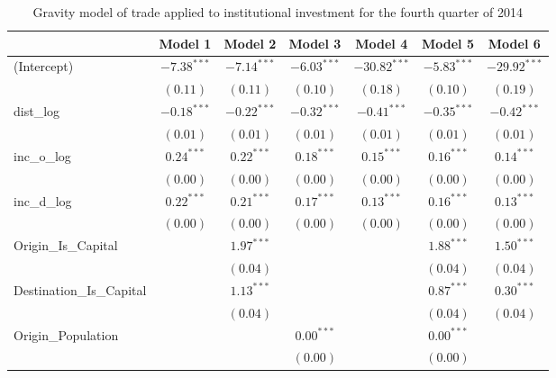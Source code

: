 \begin{table}
	\small
	\begin{center}
		\caption[Gravity Model of Trade for Q4 2014]{Gravity model of trade applied to institutional investment for the fourth quarter of 2014}
		\begin{tabular}{l c c c c c c }
			\hline
			& Model 1 & Model 2 & Model 3 & Model 4 & Model 5 & Model 6 \\
			\hline
			(Intercept)                  & $-7.38^{***}$ & $-7.14^{***}$ & $-6.03^{***}$ & $-30.82^{***}$ & $-5.83^{***}$ & $-29.92^{***}$ \\
			& $(0.11)$      & $(0.11)$      & $(0.10)$      & $(0.18)$       & $(0.10)$      & $(0.19)$       \\
			dist\_log                    & $-0.18^{***}$ & $-0.22^{***}$ & $-0.32^{***}$ & $-0.41^{***}$  & $-0.35^{***}$ & $-0.42^{***}$  \\
			& $(0.01)$      & $(0.01)$      & $(0.01)$      & $(0.01)$       & $(0.01)$      & $(0.01)$       \\
			inc\_o\_log                  & $0.24^{***}$  & $0.22^{***}$  & $0.18^{***}$  & $0.15^{***}$   & $0.16^{***}$  & $0.14^{***}$   \\
			& $(0.00)$      & $(0.00)$      & $(0.00)$      & $(0.00)$       & $(0.00)$      & $(0.00)$       \\
			inc\_d\_log                  & $0.22^{***}$  & $0.21^{***}$  & $0.17^{***}$  & $0.13^{***}$   & $0.16^{***}$  & $0.13^{***}$   \\
			& $(0.00)$      & $(0.00)$      & $(0.00)$      & $(0.00)$       & $(0.00)$      & $(0.00)$       \\
			Origin\_Is\_Capital          &               & $1.97^{***}$  &               &                & $1.88^{***}$  & $1.50^{***}$   \\
			&               & $(0.04)$      &               &                & $(0.04)$      & $(0.04)$       \\
			Destination\_Is\_Capital     &               & $1.13^{***}$  &               &                & $0.87^{***}$  & $0.30^{***}$   \\
			&               & $(0.04)$      &               &                & $(0.04)$      & $(0.04)$       \\
			Origin\_Population           &               &               & $0.00^{***}$  &                & $0.00^{***}$  &                \\
			&               &               & $(0.00)$      &                & $(0.00)$      &                \\

\end{tabular}
\end{center}
\end{table}
